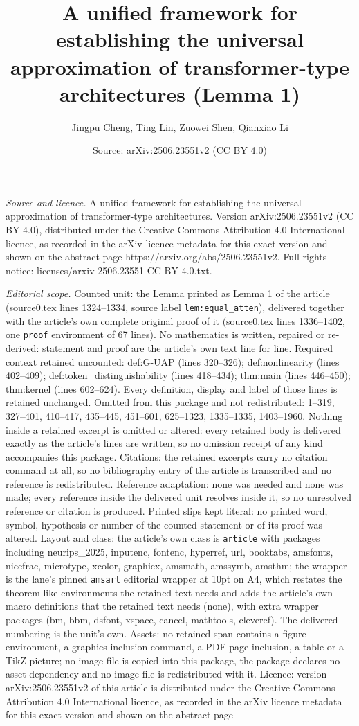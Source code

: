 \documentclass[10pt,a4paper]{amsart}
\title[A unified framework for establishing the universal approxima]{A unified framework for establishing the universal approximation of transformer-type architectures (Lemma 1)}
\author{Jingpu Cheng, Ting Lin, Zuowei Shen, Qianxiao Li}
\date{Source: arXiv:2506.23551v2 (CC BY 4.0)}
\begin{document}
\maketitle

\noindent\emph{Source and licence.} A unified framework for establishing the universal approximation of transformer-type architectures. Version arXiv:2506.23551v2 (CC BY 4.0), distributed under the Creative Commons Attribution 4.0 International licence, as recorded in the arXiv licence metadata for this exact version and shown on the abstract page https://arxiv.org/abs/2506.23551v2. Full rights notice: licenses/arxiv-2506.23551-CC-BY-4.0.txt.\par\smallskip

\noindent\textit{Editorial scope.} Counted unit: the Lemma printed as Lemma 1 of the article (source0.tex lines 1324--1334, source label \texttt{lem:equal\_atten}), delivered together with the article's own complete original proof of it (source0.tex lines 1336--1402, one \texttt{proof} environment of 67 lines). No mathematics is written, repaired or re-derived: statement and proof are the article's own text line for line. Required context retained uncounted: def:G-UAP (lines 320--326); def:nonlinearity (lines 402--409); def:token\_distinguishability (lines 418--434); thm:main (lines 446--450); thm:kernel (lines 602--624). Every definition, display and label of those lines is retained unchanged. Omitted from this package and not redistributed: 1--319, 327--401, 410--417, 435--445, 451--601, 625--1323, 1335--1335, 1403--1960. Nothing inside a retained excerpt is omitted or altered: every retained body is delivered exactly as the article's lines are written, so no omission receipt of any kind accompanies this package. Citations: the retained excerpts carry no citation command at all, so no bibliography entry of the article is transcribed and no reference is redistributed. Reference adaptation: none was needed and none was made; every reference inside the delivered unit resolves inside it, so no unresolved reference or citation is produced. Printed slips kept literal: no printed word, symbol, hypothesis or number of the counted statement or of its proof was altered. Layout and class: the article's own class is \texttt{article} with packages including neurips\_2025, inputenc, fontenc, hyperref, url, booktabs, amsfonts, nicefrac, microtype, xcolor, graphicx, amsmath, amssymb, amsthm; the wrapper is the lane's pinned \texttt{amsart} editorial wrapper at 10pt on A4, which restates the theorem-like environments the retained text needs and adds the article's own macro definitions that the retained text needs (none), with extra wrapper packages (bm, bbm, dsfont, xspace, cancel, mathtools, cleveref). The delivered numbering is the unit's own. Assets: no retained span contains a figure environment, a graphics-inclusion command, a PDF-page inclusion, a table or a TikZ picture; no image file is copied into this package, the package declares no asset dependency and no image file is redistributed with it. Licence: version arXiv:2506.23551v2 of this article is distributed under the Creative Commons Attribution 4.0 International licence, as recorded in the arXiv licence metadata for this exact version and shown on the abstract page 
\end{document}
